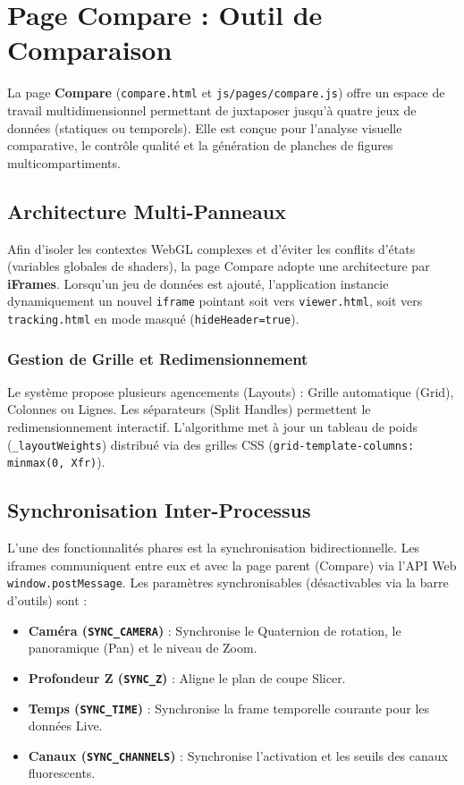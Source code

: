 \chapter{Page Compare : Outil de Comparaison}
\label{chap:compare}

La page \textbf{Compare} (\texttt{compare.html} et \texttt{js/pages/compare.js}) offre un espace de travail multidimensionnel permettant de juxtaposer jusqu'à quatre jeux de données (statiques ou temporels). Elle est conçue pour l'analyse visuelle comparative, le contrôle qualité et la génération de planches de figures multicompartiments.

\section{Architecture Multi-Panneaux}

Afin d'isoler les contextes WebGL complexes et d'éviter les conflits d'états (variables globales de shaders), la page Compare adopte une architecture par \textbf{iFrames}.
Lorsqu'un jeu de données est ajouté, l'application instancie dynamiquement un nouvel \texttt{iframe} pointant soit vers \texttt{viewer.html}, soit vers \texttt{tracking.html} en mode masqué (\texttt{hideHeader=true}).

\subsection{Gestion de Grille et Redimensionnement}
Le système propose plusieurs agencements (Layouts) : Grille automatique (Grid), Colonnes ou Lignes.
Les séparateurs (Split Handles) permettent le redimensionnement interactif. L'algorithme met à jour un tableau de poids (\texttt{\_layoutWeights}) distribué via des grilles CSS (\texttt{grid-template-columns: minmax(0, Xfr)}).

\section{Synchronisation Inter-Processus}

L'une des fonctionnalités phares est la synchronisation bidirectionnelle. Les iframes communiquent entre eux et avec la page parent (Compare) via l'API Web \texttt{window.postMessage}.
Les paramètres synchronisables (désactivables via la barre d'outils) sont :
\begin{itemize}
    \item \textbf{Caméra (\texttt{SYNC\_CAMERA})} : Synchronise le Quaternion de rotation, le panoramique (Pan) et le niveau de Zoom.
    \item \textbf{Profondeur Z (\texttt{SYNC\_Z})} : Aligne le plan de coupe Slicer.
    \item \textbf{Temps (\texttt{SYNC\_TIME})} : Synchronise la frame temporelle courante pour les données Live.
    \item \textbf{Canaux (\texttt{SYNC\_CHANNELS})} : Synchronise l'activation et les seuils des canaux fluorescents.
\end{itemize}


